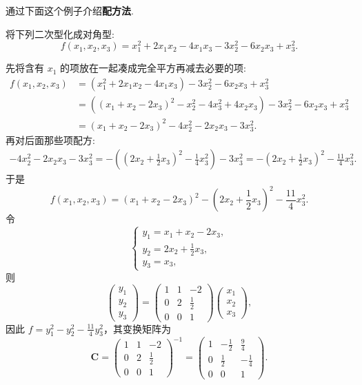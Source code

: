 \documentclass[../../main.tex]{subfiles}%
\begin{document}
通过下面这个例子介绍\textbf{配方法}.
\begin{example}\label{example:二次型化简配方法例题1}
将下列二次型化成对角型:
\[
f(x_1,x_2,x_3)=x_1^2 + 2x_1x_2 - 4x_1x_3 - 3x_2^2 - 6x_2x_3 + x_3^2.
\]
\end{example}
\begin{solution}
先将含有 $x_1$ 的项放在一起凑成完全平方再减去必要的项:
\begin{align*}
f(x_1,x_2,x_3)&=(x_1^2 + 2x_1x_2 - 4x_1x_3) - 3x_2^2 - 6x_2x_3 + x_3^2\\
&=((x_1 + x_2 - 2x_3)^2 - x_2^2 - 4x_3^2 + 4x_2x_3) - 3x_2^2 - 6x_2x_3 + x_3^2\\
&=(x_1 + x_2 - 2x_3)^2 - 4x_2^2 - 2x_2x_3 - 3x_3^2.
\end{align*}
再对后面那些项配方:
\begin{align*}
-4x_2^2 - 2x_2x_3 - 3x_3^2=-\left((2x_2 + \frac{1}{2}x_3)^2 - \frac{1}{4}x_3^2\right) - 3x_3^2
=-(2x_2 + \frac{1}{2}x_3)^2 - \frac{11}{4}x_3^2.
\end{align*}
于是
\[
f(x_1,x_2,x_3)=(x_1 + x_2 - 2x_3)^2 - (2x_2 + \frac{1}{2}x_3)^2 - \frac{11}{4}x_3^2.
\]
令
\[
\begin{cases}
y_1 = x_1 + x_2 - 2x_3,\\
y_2 = 2x_2 + \frac{1}{2}x_3,\\
y_3 = x_3,
\end{cases}
\]
则
\[
\begin{pmatrix}
y_1\\
y_2\\
y_3
\end{pmatrix}=
\begin{pmatrix}
1 & 1 & -2\\
0 & 2 & \frac{1}{2}\\
0 & 0 & 1
\end{pmatrix}
\begin{pmatrix}
x_1\\
x_2\\
x_3
\end{pmatrix},
\]
因此 $f = y_1^2 - y_2^2 - \frac{11}{4}y_3^2$，其变换矩阵为
\[
\boldsymbol{C}=
\begin{pmatrix}
1 & 1 & -2\\
0 & 2 & \frac{1}{2}\\
0 & 0 & 1
\end{pmatrix}^{-1}=
\begin{pmatrix}
1 & -\frac{1}{2} & \frac{9}{4}\\
0 & \frac{1}{2} & -\frac{1}{4}\\
0 & 0 & 1
\end{pmatrix}.
\]

\end{solution}
\end{document}
